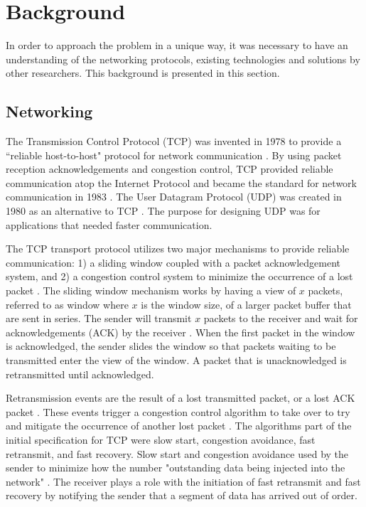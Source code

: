 \chapter{Background}

In order to approach the problem in a unique way, it was necessary to have an understanding of the networking protocols, existing technologies and solutions by other researchers. This background is presented in this section.

\section{Networking}

The Transmission Control Protocol (TCP) was invented in 1978 to provide a ``reliable host-to-host" protocol for network communication \cite{cerf1978specification}. By using packet reception acknowledgements and congestion control, TCP provided reliable communication atop the Internet Protocol and became the standard for network communication in 1983 \cite{andrews2013who}. The User Datagram Protocol (UDP) was created in 1980 as an alternative to TCP \cite{postel1980user}\cite{kozierokr2005udp}. The purpose for designing UDP was for applications that needed faster communication.

The TCP transport protocol utilizes two major mechanisms to provide reliable communication: 1) a sliding window coupled with a packet acknowledgement system, and 2) a congestion control system to minimize the occurrence of a lost packet \cite{cerf1978specification}. The sliding window mechanism works by having a view of $x$ packets, referred to as window where $x$ is the window size, of a larger packet buffer that are sent in series. The sender will transmit $x$ packets to the receiver and wait for acknowledgements (ACK) by the receiver \cite{cerf1978specification}. When the first packet in the window is acknowledged, the sender slides the window so that packets waiting to be transmitted enter the view of the window. A packet that is unacknowledged is retransmitted until acknowledged.

Retransmission events are the result of a lost transmitted packet, or a lost ACK packet \cite{cerf1978specification}. These events trigger a congestion control algorithm to take over to try and mitigate the occurrence of another lost packet \cite{allman2009tcp}. The algorithms part of the initial specification for TCP were slow start, congestion avoidance, fast retransmit, and fast recovery. Slow start and congestion avoidance used by the sender to minimize how the number "outstanding data being injected into the network" \cite{allman2009tcp}. The receiver plays a role with the initiation of fast retransmit and fast recovery by notifying the sender that a segment of data has arrived out of order.

